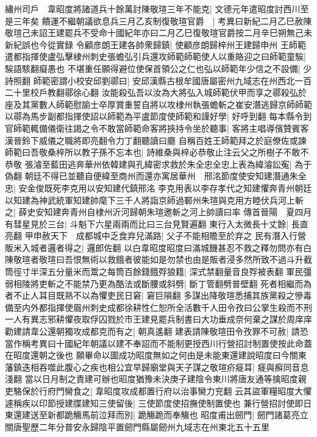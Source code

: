 繡州司戶　韋昭度將諸道兵十餘萬討陳敬瑄三年不能克|{
	文德元年遣昭度討西川至是三年矣}
饋運不繼朝議欲息兵三月乙亥制復敬瑄官爵　|{
	考異曰新紀二月乙巳赦陳敬瑄己未詔王建罷兵不受命十國紀年亦曰二月乙巳復敬瑄官爵按二月辛巳朔無己未新紀誤也今從實録}
令顧彦朗王建各帥衆歸鎮|{
	使顧彦朗歸梓州王建歸申州}
王師範遣都指揮使盧弘擊棣州刺史張蟾弘引兵還攻師範師範使人以重賂迎之曰師範童騃|{
	騃語駭翻癡愚也}
不堪重任願得避位使保首領公之仁也弘以師範年少信之不設備|{
	少詩照翻}
師範密謂小校安邱劉鄩曰|{
	安邱漢縣古根牟國唐屬密州九域志在州西北一百二十里校戶教翻鄩徐心翻}
汝能殺弘吾以汝為大將弘入城師範伏甲而享之鄩殺弘於座及其黨數人師範慰諭士卒厚賞重誓自將以攻棣州執張蟾斬之崔安潛逃歸京師師範以鄩為馬步副都指揮使詔以師範為平盧節度使師範和謹好學|{
	好呼到翻}
每本縣令到官師範輒備儀衛往謁之令不敢當師範命客將挾持令坐於聽事|{
	客將主唱導儐贊賓客漢晉鈴下威儀之職將即亮翻令力丁翻聽讀曰廳}
自稱百姓王師範拜之於庭僚佐或諫師範曰吾敬桑梓所以教子孫不忘本也|{
	詩維桑與梓必恭敬止注云父之所樹子不敢不恭敬}
張濬至藍田逃奔華州依韓建與孔緯密求救於朱全忠全忠上表為緯濬訟寃|{
	為于偽翻}
朝廷不得已並聽自便緯至商州而還亦寓居華州　邢洺節度使安知建潛通朱全忠|{
	安金俊既死李克用以安知建代鎮邢洺}
李克用表以李存孝代之知建懼奔青州朝廷以知建為神武統軍知建帥麾下三千人將詣京師過鄆州朱瑄與克用方睦伏兵河上斬之|{
	薛史安知建奔青州自棣州沂河歸朝朱瑄邀斬之河上帥讀曰率}
傳首晉陽　夏四月有彗星見於三台|{
	斗魁下六星兩兩而比曰三台見賢遍翻}
東行入太微長十丈餘|{
	長直亮翻}
甲申赦天下　成都城中乏食弃兒滿路|{
	父子不能相贍至於弃之}
民有潛入行營販米入城者邏者得之|{
	邏郎佐翻}
以白韋昭度昭度曰滿城饑甚忍不救之釋勿問亦有白陳敬瑄者敬瑄曰吾恨無術以救餓者彼能如是勿禁也由是販者浸多然所致不過斗升截筒徑寸半深五分量米而鬻之每筒百餘錢餓殍狼籍|{
	深式禁翻量音良殍被表翻}
軍民彊弱相陵將吏斬之不能禁乃更為酷法或斷腰或斜劈|{
	斷丁管翻劈普壁翻}
死者相繼而為者不止人耳目既熟不以為懼吏民日窘|{
	窘巨隕翻}
多謀出降敬瑄悉捕其族黨殺之慘毒備至内外都指揮使眉州刺史成都徐耕性仁恕所全活數千人田令孜曰公掌生殺而不刑一人有異志邪耕懼夜取俘囚戮於市王建見罷兵制書曰大功垂成奈何棄之謀於周庠庠勸建請韋公還朝獨攻成都克而有之|{
	朝真遙翻}
建表請陳敬瑄田令孜罪不可赦|{
	請恐當作稱考異曰十國紀年朝議以建不奉詔而不能制更授西川行營招討制置使按此命蓋在昭度還朝之後也}
願畢命以圖成功昭度無如之何由是未能東還建說昭度曰今關東藩鎮迭相吞噬此腹心之疾也相公宜早歸廟堂與天子謀之敬瑄疥㿅耳|{
	㿅與癬同音息淺翻}
當以日月制之責建可辦也昭度猶豫未決庚子建陰令東川將唐友通等擒昭度親吏駱保於行府門臠食之|{
	韋昭度攻成都置行府以治事臠力兖翻}
云其盜軍糧昭度大懼遽稱疾以印節授建牒建知三使留後|{
	三使節度使招撫使制置使也}
兼行營招討使即日東還建送至新都跪觴馬前泣拜而別|{
	跪觴跪而奉觴也}
昭度甫出劒門|{
	劒門諸葛亮立關唐聖歷二年分普安永歸陰平置劒門縣屬劒州九域志在州東北五十五里}
